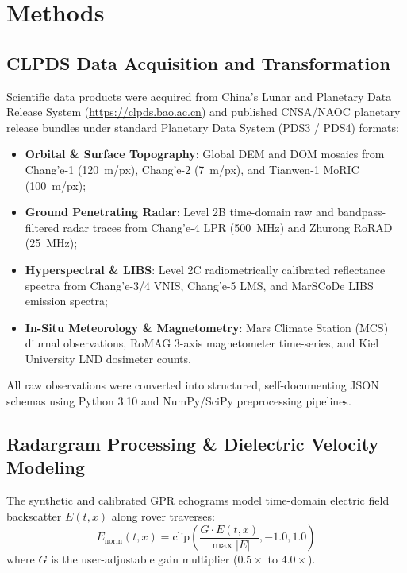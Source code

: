 \section{Methods}

\subsection{CLPDS Data Acquisition and Transformation}

Scientific data products were acquired from China's Lunar and Planetary Data Release System (\url{https://clpds.bao.ac.cn}) and published CNSA/NAOC planetary release bundles under standard Planetary Data System (PDS3 / PDS4) formats:
\begin{itemize}
    \item \textbf{Orbital \& Surface Topography}: Global DEM and DOM mosaics from Chang'e-1 (120~m/px), Chang'e-2 (7~m/px), and Tianwen-1 MoRIC (100~m/px);
    \item \textbf{Ground Penetrating Radar}: Level 2B time-domain raw and bandpass-filtered radar traces from Chang'e-4 LPR (500~MHz) and Zhurong RoRAD (25~MHz);
    \item \textbf{Hyperspectral \& LIBS}: Level 2C radiometrically calibrated reflectance spectra from Chang'e-3/4 VNIS, Chang'e-5 LMS, and MarSCoDe LIBS emission spectra;
    \item \textbf{In-Situ Meteorology \& Magnetometry}: Mars Climate Station (MCS) diurnal observations, RoMAG 3-axis magnetometer time-series, and Kiel University LND dosimeter counts.
\end{itemize}

All raw observations were converted into structured, self-documenting JSON schemas using Python 3.10 and NumPy/SciPy preprocessing pipelines.

\subsection{Radargram Processing \& Dielectric Velocity Modeling}

The synthetic and calibrated GPR echograms model time-domain electric field backscatter $E(t, x)$ along rover traverses:
\begin{equation}
    E_{\text{norm}}(t, x) = \text{clip}\left( \frac{G \cdot E(t, x)}{\max |E|}, -1.0, 1.0 \right)
    \label{eq:gain}
\end{equation}
where $G$ is the user-adjustable gain multiplier ($0.5\times$ to $4.0\times$).

